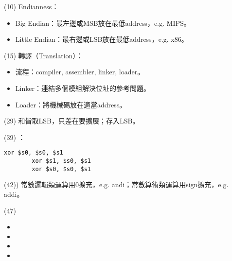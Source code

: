 \item \begin{theorem}{(10)} Endianness：\begin{itemize}
        \item Big Endian：最左邊或MSB放在最低address，e.g. MIPS。
        \item Little Endian：最右邊或LSB放在最低address，e.g. x86。
    \end{itemize}
\end{theorem}

\item \begin{theorem}{(15)} 轉譯（Translation）：\begin{itemize}
        \item 流程：compiler, assembler, linker, loader。
        \item Linker：連結多個模組解決位址的參考問題。
        \item Loader：將機械碼放在適當address。
    \end{itemize}
\end{theorem}

\item \begin{theorem}{(29)} 和皆取LSB，只差在要擴展；存入LSB。
\end{theorem}

\item \begin{theorem}{(39)} ： \begin{lstlisting}[language={[x86masm]Assembler}]
        xor $s0, $s0, $s1
        xor $s1, $s0, $s1
        xor $s0, $s0, $s1
    \end{lstlisting}
\end{theorem}

\item \begin{theorem}{(42))} 常數邏輯類運算用$0$擴充，e.g. andi；常數算術類運算用sign擴充，e.g. addi。
\end{theorem}

\item \begin{theorem}{(47)} \quad\quad \begin{itemize}
        \item {}
        \item {}
        \item {}
        \item {}
    \end{itemize}
\end{theorem}

